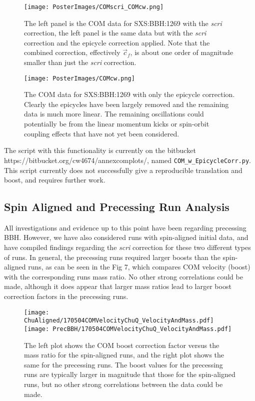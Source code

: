 \documentclass{article}
\begin{document}
\begin{figure}
	\texttt{[image: PosterImages/COMscri\_COMcw.png]}
	\caption{The left panel is the COM data for SXS:BBH:1269 with the \textit{scri} correction, the left panel is the same data but with the \textit{scri} correction and the epicycle correction applied. Note that the combined correction, effectively $\vec{c}_f$, is about one order of magnitude smaller than just the \textit{scri} correction.} 
\end{figure}

\begin{figure}
	\center
	\texttt{[image: PosterImages/COMcw.png]}
	\caption{The COM data for SXS:BBH:1269 with only the epicycle correction. Clearly the epicycles have been largely removed and the remaining data is much more linear. The remaining oscillations could potentially be from the linear momentum kicks or spin-orbit coupling effects that have not yet been considered.}
\end{figure}

The script with this functionality is currently on the bitbucket https://bitbucket.org/cw4674/annexcomplots/, named \texttt{COM\_w\_EpicycleCorr.py}. This script currently does not successfully give a reproducible translation and boost, and requires further work.

\subsection{Spin Aligned and Precessing Run Analysis}
All investigations and evidence up to this point have been regarding precessing BBH. However, we have also considered runs with spin-aligned initial data, and have compiled findings regarding the \textit{scri} correction for these two different types of runs.
In general, the precessing runs required larger boosts than the spin-aligned runs, as can be seen in the Fig 7, which compares COM velocity (boost) with the corresponding runs mass ratio. No other strong correlations could be made, although it does appear that larger mass ratios lead to larger boost correction factors in the precessing runs.

\begin{figure}
	\texttt{[image: ChuAligned/170504COMVelocityChuQ\_VelocityAndMass.pdf]}
	\texttt{[image: PrecBBH/170504COMVelocityChuQ\_VelocityAndMass.pdf]}
	\caption{The left plot shows the COM boost correction factor versus the mass ratio for the spin-aligned runs, and the right plot shows the same for the precessing runs. The boost values for the precessing runs are typically larger in magnitude that those for the spin-aligned runs, but no other strong correlations between the data could be made.}
\end{figure}
\end{document}
